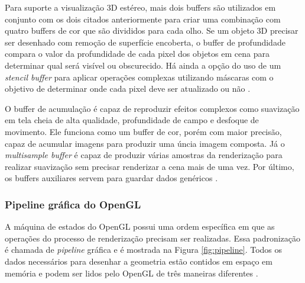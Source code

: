 Para suporte a visualização 3D estéreo, mais dois buffers são utilizados em conjunto com os dois citados anteriormente para criar uma combinação com quatro buffers de cor que são divididos para cada olho. Se um objeto 3D precisar ser desenhado com remoção de superfície encoberta, o buffer de profundidade compara o valor da profundidade de cada pixel dos objetos em cena para determinar qual será visível ou obscurecido. Há ainda a opção do uso de um \textit{stencil buffer} para aplicar operações complexas utilizando máscaras com o objetivo de determinar onde cada pixel deve ser atualizado ou não \cite{GLSLBook}.

O buffer de acumulação é capaz de reproduzir efeitos complexos como suavização em tela cheia de alta qualidade, profundidade de campo e desfoque de movimento. Ele funciona como um buffer de cor, porém com maior precisão, capaz de acumular imagens para produzir uma úncia imagem composta. Já o \textit{multisample buffer} é capaz de produzir várias amostras da renderização para realizar suavização sem precisar renderizar a cena mais de uma vez. Por último, os buffers auxiliares servem para guardar dados genéricos \cite{GLSLBook}. 

\subsubsection{Pipeline gráfica do OpenGL}
\label{sec:pipeline-opengl}

A máquina de estados do OpenGL possui uma ordem específica em que as operações do processo de renderização precisam ser realizadas. Essa padronização é chamada de \textit{pipeline} gráfica e é mostrada na Figura \ref{fig:pipeline}. Todos os dados necessários para desenhar a geometria estão contidos em espaço em memória e podem ser lidos pelo OpenGL de três maneiras diferentes \cite{GLSLBook}. 

\begin{figure}[h!]
	\centering
\end{figure}
\nocite{pipeline}

